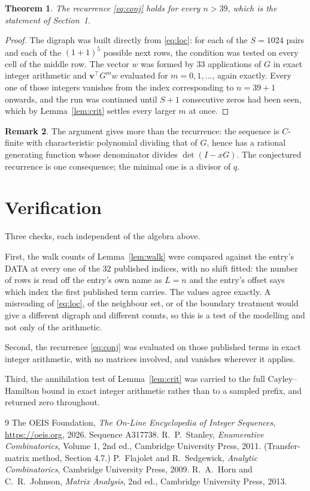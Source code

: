 \documentclass[11pt,a4paper]{article}
\theoremstyle{plain}
\newtheorem{theorem}{Theorem}
\theoremstyle{definition}
\newtheorem{remark}[theorem]{Remark}
\begin{document}
\begin{theorem}
The recurrence \eqref{eq:conj} holds for every $n>39$, which is the statement of
Section~1.
\end{theorem}

\begin{proof}
The digraph was built directly from \eqref{eq:loc}: for each of the $S=1024$ pairs and each
of the $(1+1)^{5}$ possible next rows, the condition was tested on every cell of
the middle row. The vector $w$ was formed by $33$ applications of $G$ in exact integer
arithmetic and $\mathbf{v}^{\!\top}G^{m}w$ evaluated for $m=0,1,\dots$, again exactly.
Every one of those integers vanishes from the index corresponding to $n=39+1$ onwards,
and the run was continued until $S+1$ consecutive zeros had been seen, which by
Lemma~\ref{lem:crit} settles every larger $m$ at once.
\end{proof}

\begin{remark}
The argument gives more than the recurrence: the sequence is $C$-finite with characteristic
polynomial dividing that of $G$, hence has a rational generating function whose denominator
divides $\det(I-xG)$. The conjectured recurrence is one consequence; the minimal one is a
divisor of $q$.
\end{remark}

\section{Verification}

Three checks, each independent of the algebra above.

First, the walk counts of Lemma~\ref{lem:walk} were compared against the entry's DATA at
every one of the $32$ published indices, with no shift fitted: the number of rows is
read off the entry's own name as $L=n$ and the entry's offset says which index the first
published term carries. The values agree exactly. A misreading of \eqref{eq:loc}, of the
neighbour set, or of the boundary treatment would give a different digraph and different
counts, so this is a test of the modelling and not only of the arithmetic.

Second, the recurrence \eqref{eq:conj} was evaluated on those published terms in exact
integer arithmetic, with no matrices involved, and vanishes wherever it applies.

Third, the annihilation test of Lemma~\ref{lem:crit} was carried to the full
Cayley--Hamilton bound in exact integer arithmetic rather than to a sampled prefix, and
returned zero throughout.

\begin{thebibliography}{9}
 The OEIS Foundation, \emph{The On-Line Encyclopedia of Integer
Sequences}, \url{https://oeis.org}, 2026. Sequence A317738.
 R.~P.~Stanley, \emph{Enumerative Combinatorics}, Volume 1, 2nd ed.,
Cambridge University Press, 2011. (Transfer-matrix method, Section 4.7.)
 P.~Flajolet and R.~Sedgewick, \emph{Analytic Combinatorics}, Cambridge
University Press, 2009.
 R.~A.~Horn and C.~R.~Johnson, \emph{Matrix Analysis}, 2nd ed., Cambridge
University Press, 2013.
\end{thebibliography}
\end{document}
